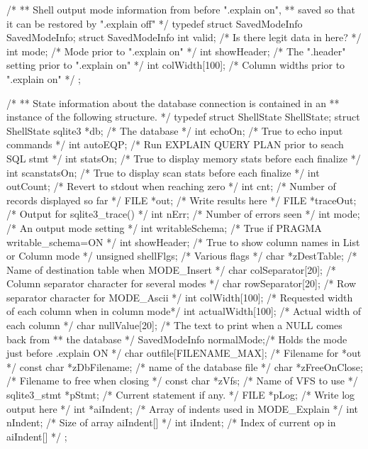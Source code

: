 \begin{Codex}[label=shell.c,numbers=left]
/*
** Shell output mode information from before ".explain on", 
** saved so that it can be restored by ".explain off"
*/
typedef struct SavedModeInfo SavedModeInfo;
struct SavedModeInfo {
  int valid;          /* Is there legit data in here? */
  int mode;           /* Mode prior to ".explain on" */
  int showHeader;     /* The ".header" setting prior to ".explain on" */
  int colWidth[100];  /* Column widths prior to ".explain on" */
};

/*
** State information about the database connection is contained in an
** instance of the following structure.
*/
typedef struct ShellState ShellState;
struct ShellState {
  sqlite3 *db;           /* The database */
  int echoOn;            /* True to echo input commands */
  int autoEQP;           /* Run EXPLAIN QUERY PLAN prior to seach SQL stmt */
  int statsOn;           /* True to display memory stats before each finalize */
  int scanstatsOn;       /* True to display scan stats before each finalize */
  int outCount;          /* Revert to stdout when reaching zero */
  int cnt;               /* Number of records displayed so far */
  FILE *out;             /* Write results here */
  FILE *traceOut;        /* Output for sqlite3_trace() */
  int nErr;              /* Number of errors seen */
  int mode;              /* An output mode setting */
  int writableSchema;    /* True if PRAGMA writable_schema=ON */
  int showHeader;        /* True to show column names in List or Column mode */
  unsigned shellFlgs;    /* Various flags */
  char *zDestTable;      /* Name of destination table when MODE_Insert */
  char colSeparator[20]; /* Column separator character for several modes */
  char rowSeparator[20]; /* Row separator character for MODE_Ascii */
  int colWidth[100];     /* Requested width of each column when in column mode*/
  int actualWidth[100];  /* Actual width of each column */
  char nullValue[20];    /* The text to print when a NULL comes back from
                         ** the database */
  SavedModeInfo normalMode;/* Holds the mode just before .explain ON */
  char outfile[FILENAME_MAX]; /* Filename for *out */
  const char *zDbFilename;    /* name of the database file */
  char *zFreeOnClose;         /* Filename to free when closing */
  const char *zVfs;           /* Name of VFS to use */
  sqlite3_stmt *pStmt;   /* Current statement if any. */
  FILE *pLog;            /* Write log output here */
  int *aiIndent;         /* Array of indents used in MODE_Explain */
  int nIndent;           /* Size of array aiIndent[] */
  int iIndent;           /* Index of current op in aiIndent[] */
};


\end{Codex}
